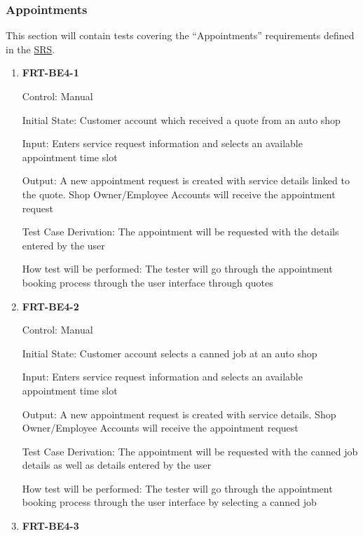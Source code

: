 \documentclass[12pt, titlepage]{article}
\begin{document}
\subsubsection{Appointments}

This section will contain tests covering the ``Appointments'' requirements defined in the
\href{https://github.com/arkinmodi/project-sayyara/blob/main/docs/SRS/SRS.pdf}{SRS}.

\begin{enumerate}

	\item \textbf{FRT-BE4-1}

	      Control: Manual

	      Initial State: Customer account which received a quote from an auto shop

	      Input: Enters service request information and selects an available appointment time slot

	      Output: A new appointment request is created with service details linked to the quote. Shop
	      Owner/Employee Accounts will receive the appointment request

	      Test Case Derivation: The appointment will be requested with the details entered by the user

	      How test will be performed: The tester will go through the appointment booking process through the
	      user interface through quotes

	\item \textbf{FRT-BE4-2}

	      Control: Manual

	      Initial State: Customer account selects a canned job at an auto shop

	      Input: Enters service request information and selects an available appointment time slot

	      Output: A new appointment request is created with service details. Shop Owner/Employee Accounts
	      will receive the appointment request

	      Test Case Derivation: The appointment will be requested with the canned job details as well as
	      details entered by the user

	      How test will be performed: The tester will go through the appointment booking process through the
	      user interface by selecting a canned job

	\item \textbf{FRT-BE4-3}


\end{enumerate}
\end{document}
